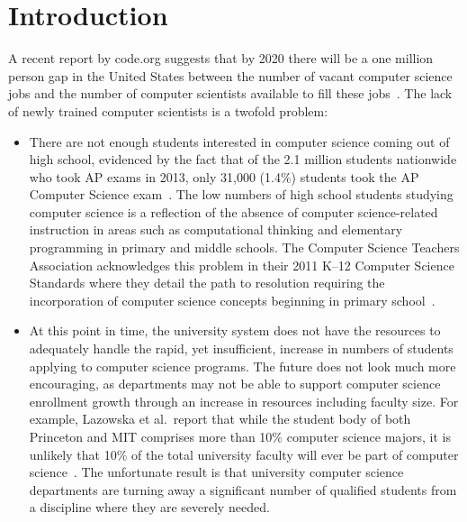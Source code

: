 \chapter{Introduction} \label{chap:introduction}
A recent report by code.org suggests that by 2020 there will be a one million
person gap in the United States between the number of vacant computer science
jobs and the number of computer scientists available to fill these
jobs~\cite{codeorg:2013}. The lack of newly trained computer scientists is a
twofold problem:

\begin{itemize}
\item There are not enough students interested in computer science coming out
  of high school, evidenced by the fact that of the 2.1 million students
  nationwide who took AP exams in 2013, only 31,000 (1.4\%) students took the
  AP Computer Science exam~\cite{cb:2013}. The low numbers of high school
  students studying computer science is a reflection of the absence of computer
  science-related instruction in areas such as computational thinking and
  elementary programming in primary and middle schools. The Computer Science
  Teachers Association acknowledges this problem in their 2011 K--12 Computer
  Science Standards where they detail the path to resolution requiring the
  incorporation of computer science concepts beginning in primary
  school~\cite{cstastandards}.
\item At this point in time, the university system does not have the resources
  to adequately handle the rapid, yet insufficient, increase in numbers of
  students applying to computer science programs. The future does not look much
  more encouraging, as departments may not be able to support computer science
  enrollment growth through an increase in resources including faculty
  size. For example, Lazowska et al.\ report that while the student body of
  both Princeton and MIT comprises more than 10\% computer science majors, it
  is unlikely that 10\% of the total university faculty will ever be part of
  computer science~\cite{lazowska:2014}. The unfortunate result is that
  university computer science departments are turning away a significant number
  of qualified students from a discipline where they are severely needed.
\end{itemize}

